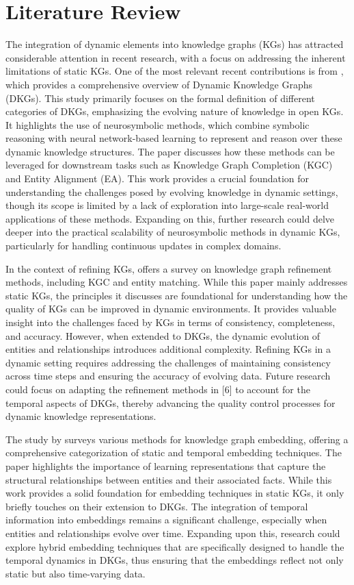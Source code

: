 \section{Literature Review}

The integration of dynamic elements into knowledge graphs (KGs) has attracted considerable attention in recent research, with a focus on addressing the inherent limitations of static KGs. One of the most relevant recent contributions is from \cite{polleres2023}, which provides a comprehensive overview of Dynamic Knowledge Graphs (DKGs). This study primarily focuses on the formal definition of different categories of DKGs, emphasizing the evolving nature of knowledge in open KGs. It highlights the use of neurosymbolic methods, which combine symbolic reasoning with neural network-based learning to represent and reason over these dynamic knowledge structures. The paper discusses how these methods can be leveraged for downstream tasks such as Knowledge Graph Completion (KGC) and Entity Alignment (EA). This work provides a crucial foundation for understanding the challenges posed by evolving knowledge in dynamic settings, though its scope is limited by a lack of exploration into large-scale real-world applications of these methods. Expanding on this, further research could delve deeper into the practical scalability of neurosymbolic methods in dynamic KGs, particularly for handling continuous updates in complex domains.

In the context of refining KGs, \cite{paulheim2016} offers a survey on knowledge graph refinement methods, including KGC and entity matching. While this paper mainly addresses static KGs, the principles it discusses are foundational for understanding how the quality of KGs can be improved in dynamic environments. It provides valuable insight into the challenges faced by KGs in terms of consistency, completeness, and accuracy. However, when extended to DKGs, the dynamic evolution of entities and relationships introduces additional complexity. Refining KGs in a dynamic setting requires addressing the challenges of maintaining consistency across time steps and ensuring the accuracy of evolving data. Future research could focus on adapting the refinement methods in [6] to account for the temporal aspects of DKGs, thereby advancing the quality control processes for dynamic knowledge representations.

The study by \cite{wang2016} surveys various methods for knowledge graph embedding, offering a comprehensive categorization of static and temporal embedding techniques. The paper highlights the importance of learning representations that capture the structural relationships between entities and their associated facts. While this work provides a solid foundation for embedding techniques in static KGs, it only briefly touches on their extension to DKGs. The integration of temporal information into embeddings remains a significant challenge, especially when entities and relationships evolve over time. Expanding upon this, research could explore hybrid embedding techniques that are specifically designed to handle the temporal dynamics in DKGs, thus ensuring that the embeddings reflect not only static but also time-varying data.

